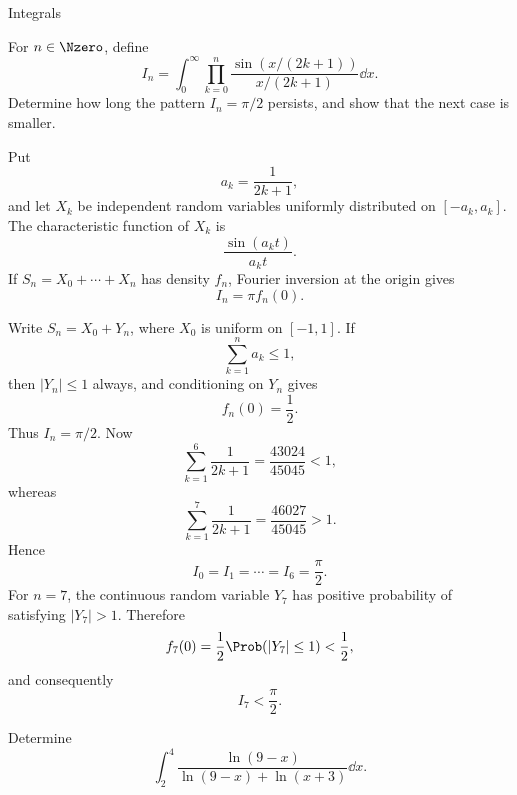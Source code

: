 \begin{expectedproblemgroup}{Integrals}
        \begin{expectedsubproblem}
            For $n\in\Nzero$, define
            \[
                I_n
                =
                \int_0^{\infty}
                \prod_{k=0}^{n}
                \frac{\sin(x/(2k+1))}{x/(2k+1)}\dd x.
            \]
            Determine how long the pattern $I_n=\pi/2$ persists, and show that
            the next case is smaller.
        \end{expectedsubproblem}

        \begin{expectedsubsolution}
            Put
            \[
                a_k=\frac{1}{2k+1},
            \]
            and let $X_k$ be independent random variables uniformly distributed on
            $[-a_k,a_k]$. The characteristic function of $X_k$ is
            \[
                \frac{\sin(a_k t)}{a_k t}.
            \]
            If $S_n=X_0+\cdots+X_n$ has density $f_n$, Fourier inversion at the
            origin gives
            \[
                I_n=\pi f_n(0).
            \]

            Write $S_n=X_0+Y_n$, where $X_0$ is uniform on $[-1,1]$. If
            \[
                \sum_{k=1}^{n}a_k\leq1,
            \]
            then $|Y_n|\leq1$ always, and conditioning on $Y_n$ gives
            \[
                f_n(0)=\frac12.
            \]
            Thus $I_n=\pi/2$. Now
            \[
                \sum_{k=1}^{6}\frac{1}{2k+1}
                =
                \frac{43024}{45045}<1,
            \]
            whereas
            \[
                \sum_{k=1}^{7}\frac{1}{2k+1}
                =
                \frac{46027}{45045}>1.
            \]
            Hence
            \[
                \boxed{I_0=I_1=\cdots=I_6=\frac{\pi}{2}}.
            \]
            For $n=7$, the continuous random variable $Y_7$ has positive
            probability of satisfying $|Y_7|>1$. Therefore
            \[
                f_7(0)
                =
                \frac12\Prob(|Y_7|\leq1)
                <
                \frac12,
            \]
            and consequently
            \[
                \boxed{I_7<\frac{\pi}{2}}.
            \]
        \end{expectedsubsolution}

        \begin{expectedsubproblem}[1987 Putnam]
            Determine
            \[
                \int_2^4
                \frac{\ln(9-x)}{
                    \ln(9-x)+\ln(x+3)
                }
                \dd x.
            \]
        \end{expectedsubproblem}


\end{expectedproblemgroup}

